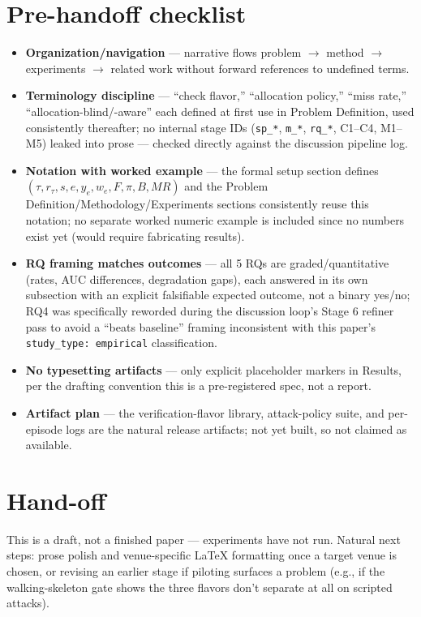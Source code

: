\documentclass[11pt]{article}
\begin{document}
\section*{Pre-handoff checklist}
\begin{itemize}[leftmargin=1.4em]
\item \textbf{Organization/navigation} --- narrative flows problem $\to$ method $\to$ experiments $\to$ related work without forward references to undefined terms.
\item \textbf{Terminology discipline} --- ``check flavor,'' ``allocation policy,'' ``miss rate,'' ``allocation-blind/-aware'' each defined at first use in Problem Definition, used consistently thereafter; no internal stage IDs (\texttt{sp\_*}, \texttt{m\_*}, \texttt{rq\_*}, C1--C4, M1--M5) leaked into prose --- checked directly against the discussion pipeline log.
\item \textbf{Notation with worked example} --- the formal setup section defines $(\tau, r_\tau, s, e, y_e, w_e, F, \pi, B, MR)$ and the Problem Definition/Methodology/Experiments sections consistently reuse this notation; no separate worked numeric example is included since no numbers exist yet (would require fabricating results).
\item \textbf{RQ framing matches outcomes} --- all 5 RQs are graded/quantitative (rates, AUC differences, degradation gaps), each answered in its own subsection with an explicit falsifiable expected outcome, not a binary yes/no; RQ4 was specifically reworded during the discussion loop's Stage 6 refiner pass to avoid a ``beats baseline'' framing inconsistent with this paper's \texttt{study\_type: empirical} classification.
\item \textbf{No typesetting artifacts} --- only explicit placeholder markers in Results, per the drafting convention this is a pre-registered spec, not a report.
\item \textbf{Artifact plan} --- the verification-flavor library, attack-policy suite, and per-episode logs are the natural release artifacts; not yet built, so not claimed as available.
\end{itemize}

\section*{Hand-off}
This is a draft, not a finished paper --- experiments have not run. Natural next steps: prose polish and venue-specific LaTeX formatting once a target venue is chosen, or revising an earlier stage if piloting surfaces a problem (e.g., if the walking-skeleton gate shows the three flavors don't separate at all on scripted attacks).



\end{document}
